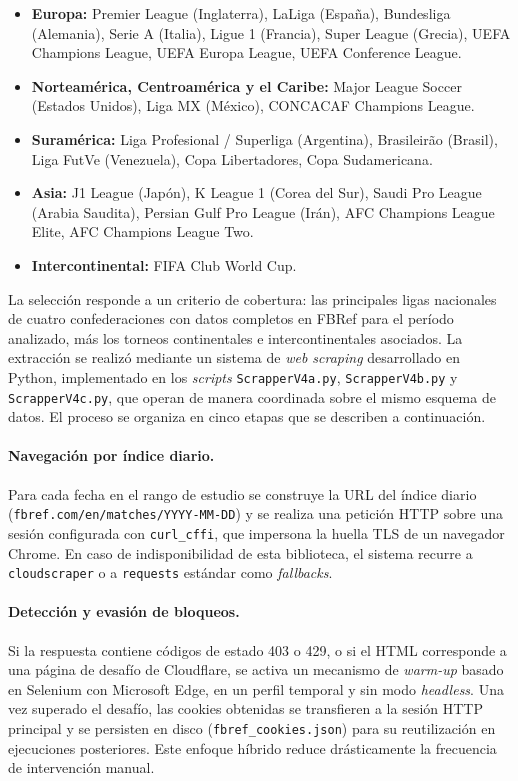 \begin{itemize}
	\item \textbf{Europa:} Premier League (Inglaterra), LaLiga (Espa\~na), Bundesliga (Alemania), Serie A (Italia), Ligue 1 (Francia), Super League (Grecia), UEFA Champions League, UEFA Europa League, UEFA Conference League.
	\item \textbf{Norteam\'erica, Centroam\'erica y el Caribe:} Major League Soccer (Estados Unidos), Liga MX (M\'exico), CONCACAF Champions League.
	\item \textbf{Suram\'erica:} Liga Profesional / Superliga (Argentina), Brasileir\~ao (Brasil), Liga FutVe (Venezuela), Copa Libertadores, Copa Sudamericana.
	\item \textbf{Asia:} J1 League (Jap\'on), K League 1 (Corea del Sur), Saudi Pro League (Arabia Saudita), Persian Gulf Pro League (Ir\'an), AFC Champions League Elite, AFC Champions League Two.
	\item \textbf{Intercontinental:} FIFA Club World Cup.
\end{itemize}

La selecci\'on responde a un criterio de cobertura: las principales ligas nacionales de cuatro confederaciones con datos completos en FBRef para el per\'iodo analizado, m\'as los torneos continentales e intercontinentales asociados. La extracci\'on se realiz\'o mediante un sistema de \textit{web scraping} desarrollado en Python, implementado en los \textit{scripts} \texttt{ScrapperV4a.py}, \texttt{ScrapperV4b.py} y  \texttt{ScrapperV4c.py}, que operan de manera coordinada sobre el mismo esquema de datos. El proceso se organiza en cinco etapas que se  describen a continuaci\'on.

\paragraph{Navegaci\'on por \'indice diario.} Para cada fecha en el rango de estudio se construye la URL del \'indice diario (\texttt{fbref.com/en/matches/YYYY-MM-DD}) y se realiza una petici\'on HTTP sobre una sesi\'on configurada con \texttt{curl\_cffi}, que impersona la huella TLS de un navegador Chrome. En caso de indisponibilidad de esta biblioteca, el sistema recurre a \texttt{cloudscraper} o a \texttt{requests} est\'andar como \textit{fallbacks}.

\paragraph{Detecci\'on y evasi\'on de bloqueos.} Si la respuesta contiene c\'odigos de estado 403 o 429, o si el HTML corresponde a una p\'agina de desaf\'io de Cloudflare, se activa un mecanismo de \textit{warm-up} basado en Selenium con Microsoft Edge, en un perfil temporal y sin modo \textit{headless}. Una vez superado el desaf\'io, las cookies obtenidas se transfieren a la sesi\'on HTTP principal y se persisten en disco (\texttt{fbref\_cookies.json}) para su reutilizaci\'on en ejecuciones posteriores. Este enfoque h\'ibrido reduce dr\'asticamente la frecuencia de intervenci\'on manual.

